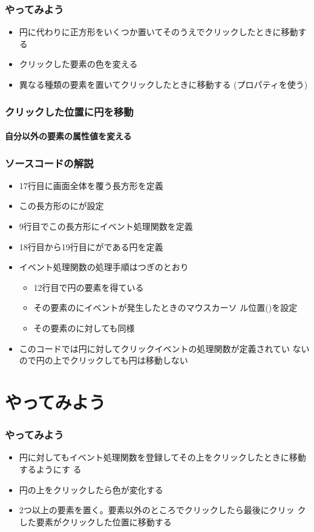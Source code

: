  \begin{frame}[containsverbatim]
  \frametitle{やってみよう}
  \begin{itemize}
   \item 円に代わりに正方形をいくつか置いてそのうえでクリックしたときに移動する
   \item クリックした要素の色を変える
   \item 異なる種類の要素を置いてクリックしたときに移動する
         (プロパティを使う)
  \end{itemize}
 
 \end{frame}
\begin{frame}[containsverbatim]
 \frametitle{クリックした位置に円を移動}
 \framesubtitle{自分以外の要素の属性値を変える}
\end{frame}
\begin{frame}[containsverbatim]
 \frametitle{ソースコードの解説}
 \begin{itemize}
  \item 17行目に画面全体を覆う長方形を定義
  \item この長方形のにが設定
  \item 9行目でこの長方形にイベント処理関数を定義
  \item 18行目から19行目にがである円を定義
  \item イベント処理関数の処理手順はつぎのとおり
        \begin{itemize}
         \item 12行目で円の要素を得ている
         \item その要素のにイベントが発生したときのマウスカーソ
               ル位置()を設定
         \item その要素のに対しても同様
        \end{itemize}
  \item このコードでは円に対してクリックイベントの処理関数が定義されてい
        ないので円の上でクリックしても円は移動しない
 \end{itemize}
\end{frame}
\section{やってみよう}
\begin{frame}[containsverbatim]
 \frametitle{やってみよう}
 \begin{itemize}
  \item 円に対してもイベント処理関数を登録してその上をクリックしたときに移動するようにす
        る
  \item 円の上をクリックしたら色が変化する
  \item 2つ以上の要素を置く。要素以外のところでクリックしたら最後にクリッ
        クした要素がクリックした位置に移動する
 \end{itemize}
\end{frame}

\begin{frame}[containsverbatim]
 \frametitle{}
\end{frame}
